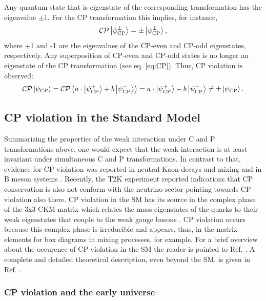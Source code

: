 Any quantum state that is eigenstate of the corresponding transformation has the eigenvalue $\pm 1$. For the CP transformation this implies, for instance,
\begin{equation}
    \mathcal{CP}\left| \psi^{\pm}_\text{CP} \right> = \pm \left| \psi^{\pm}_\text{CP} \right>,
\end{equation} 
where +1 and -1 are the eigenvalues of the CP-even and CP-odd eigenstates, respectively. Any superposition of CP-even and CP-odd states is no longer an eigenstate of the CP transformation (see eq. \eqref{eq:CP}). Thus, CP violation is observed:
\begin{equation}\label{eq:CP}
    \mathcal{CP}\left| \psi_\text{CP} \right> = \mathcal{CP}\left( a \cdot \left| \psi^{+}_\text{CP} \right> + b \left| \psi^{-}_\text{CP} \right>  \right) =  a \cdot \left| \psi^{+}_\text{CP} \right> -  b \left| \psi^{-}_\text{CP} \right> \neq \pm \left| \psi_\text{CP} \right>.
\end{equation} 

\subsection{CP violation in the Standard Model}

Summarizing the properties of the weak interaction under C and P transformations above, one would expect that the weak interaction 
is at least invariant under simultaneous C and P transformations. In contrast to that, evidence for CP violation was reported in 
neutral Kaon decays and mixing  \cite{Christenson:1964fg,Bluemer:503743,Gorini:884851} and in B meson systems \cite{PhysRevLett.87.091801,Aubert:2002ya,PhysRevD.68.051101,PhysRevLett.91.201802,PhysRevLett.89.281802}.
Recently, the T2K experiment reported indications that CP conservation is also not conform with the neutrino sector \cite{Abe:2017uxa} pointing towards CP violation also there. CP violation in the SM has its source in the complex phase of the 3x3 CKM-matrix which relates the mass eigenstates of the quarks to their
weak eigenstates that couple to the weak gauge bosons \cite{PhysRev.105.1413}. 
CP violation occurs because this complex phase is irreducible and appears, thus, in the matrix elements for box diagrams in mixing processes, for example. 
For a brief overview about the occurence of CP violation in the SM the reader is pointed to Ref. \cite{Thomson:2013zua}. A complete and detailed theoretical description, even beyond the SM, is given in Ref. \cite{Branco:1999fs}.

\subsubsection{CP violation and the early universe}

